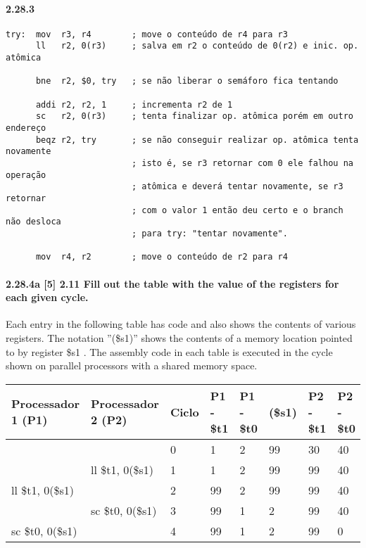 \documentclass{article}
\begin{document}
\paragraph{2.28.3}

\begin{verbatim}
try:  mov  r3, r4        ; move o conteúdo de r4 para r3
      ll   r2, 0(r3)     ; salva em r2 o conteúdo de 0(r2) e inic. op. atômica

      bne  r2, $0, try   ; se não liberar o semáforo fica tentando

      addi r2, r2, 1     ; incrementa r2 de 1
      sc   r2, 0(r3)     ; tenta finalizar op. atômica porém em outro endereço
      beqz r2, try       ; se não conseguir realizar op. atômica tenta novamente
                         ; isto é, se r3 retornar com 0 ele falhou na operação
                         ; atômica e deverá tentar novamente, se r3 retornar 
                         ; com o valor 1 então deu certo e o branch não desloca 
                         ; para try: "tentar novamente".

      mov  r4, r2        ; move o conteúdo de r2 para r4
\end{verbatim}

\pagebreak
\paragraph{2.28.4a [5] 2.11 Fill out the table with the value of the registers 
for each given cycle.}

Each entry in the following table has code and also shows the contents of
various registers. The notation ''(\$s1)'' shows the contents of a memory
location pointed to by register \$s1 . The assembly code in each table is
executed in the cycle shown on parallel processors with a shared memory space.


\begin{table}[ht!]
\centering
\begin{tabular}{|l|l|l|l|l|l|l|l|}
\hline Processador 1 (P1) &
       Processador 2 (P2) &
       Ciclo              &
       P1 - \$t1          &
       P1 - \$t0          &
       (\$s1)             &
       P2 - \$t1          &
       P2 - \$t0          \\

\hline                  &                  & 0 & 1  & 2 & 99 & 30 & 40 \\ 
\hline                  & ll \$t1, 0(\$s1) & 1 & 1  & 2 & 99 & 99 & 40 \\ 
\hline ll \$t1, 0(\$s1) &                  & 2 & 99 & 2 & 99 & 99 & 40 \\ 
\hline                  & sc \$t0, 0(\$s1) & 3 & 99 & 1 & 2  & 99 & 40 \\ 
\hline sc \$t0, 0(\$s1) &                  & 4 & 99 & 1 & 2  & 99 & 0  \\ 
\hline 
\end{tabular} 
\end{table}
\end{document}
